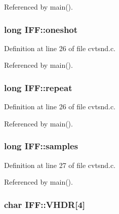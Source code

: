 Referenced by main().

\hypertarget{structIFF_a5099f06518cae6f23aed101a7d41abeb}{
\subsubsection[{oneshot}]{\setlength{\rightskip}{0pt plus 5cm}long I\+F\+F\+::oneshot}}\label{structIFF_a5099f06518cae6f23aed101a7d41abeb}


Definition at line 26 of file cvtsnd.\+c.



Referenced by main().

\hypertarget{structIFF_a3e53c273523a28fd8c3bcc3da8778bdd}{
\subsubsection[{repeat}]{\setlength{\rightskip}{0pt plus 5cm}long I\+F\+F\+::repeat}}\label{structIFF_a3e53c273523a28fd8c3bcc3da8778bdd}


Definition at line 26 of file cvtsnd.\+c.



Referenced by main().

\hypertarget{structIFF_ac3d8e88e81739232da3592001db90724}{
\subsubsection[{samples}]{\setlength{\rightskip}{0pt plus 5cm}long I\+F\+F\+::samples}}\label{structIFF_ac3d8e88e81739232da3592001db90724}


Definition at line 27 of file cvtsnd.\+c.



Referenced by main().

\hypertarget{structIFF_a4d304147a1dbd30fb31727571f38418b}{
\subsubsection[{V\+H\+D\+R}]{\setlength{\rightskip}{0pt plus 5cm}char I\+F\+F\+::\+V\+H\+D\+R\mbox{[}4\mbox{]}}}\label{structIFF_a4d304147a1dbd30fb31727571f38418b}


